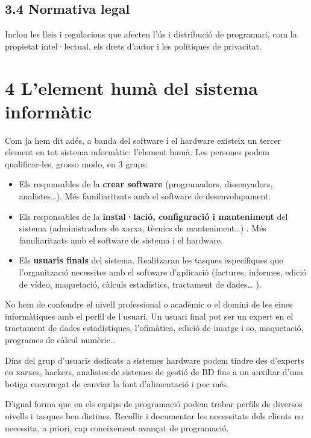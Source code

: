 \documentclass[
  12 pt,
  a4paper,
]{article}
\begin{document}
\subsection{3.4 Normativa legal}\label{normativa-legal}

Inclou les lleis i regulacions que afecten l'ús i distribució de
programari, com la propietat intel·lectual, els drets d'autor i les
polítiques de privacitat.

\section{4 L'element humà del sistema
informàtic}\label{lelement-humuxe0-del-sistema-informuxe0tic}

Com ja hem dit adés, a banda del software i el hardware existeix un
tercer element en tot sistema informàtic: l'element humà. Les persones
podem qualificar-les, grosso modo, en 3 grups:

\begin{itemize}
\item
  Els responsables de la \textbf{crear software} (programadors,
  dissenyadors, analistes\ldots). Més familiaritzats amb el software de
  desenvolupament.
\item
  Els responsables de la \textbf{instal·lació, configuració i
  manteniment} del sistema (administradors de xarxa, tècnics de
  manteniment\ldots) . Més familiaritzats amb el software de sistema i
  el hardware.
\item
  Els \textbf{usuaris finals} del sistema. Realitzaran les tasques
  específiques que l'organització necessites amb el software d'aplicació
  (factures, informes, edició de vídeo, maquetació, càlculs estadístics,
  tractament de dades\ldots{} ).
\end{itemize}

No hem de confondre el nivell professional o acadèmic o el domini de les
eines informàtiques amb el perfil de l'usuari. Un usuari final pot ser
un expert en el tractament de dades estadístiques, l'ofimàtica, edició
de imatge i so, maquetació, programes de càlcul numèric\ldots{}

Dins del grup d'usuaris dedicats a sistemes hardware podem tindre des
d'experts en xarxes, hackers, analistes de sistemes de gestió de BD fins
a un auxiliar d'una botiga encarregat de canviar la font d'alimentació i
poc més.

D'igual forma que en els equips de programació podem trobar perfils de
diversos nivells i tasques ben distines. Recollir i documentar les
necessitats dels clients no necessita, a priori, cap coneixement avançat
de programació.
\end{document}
